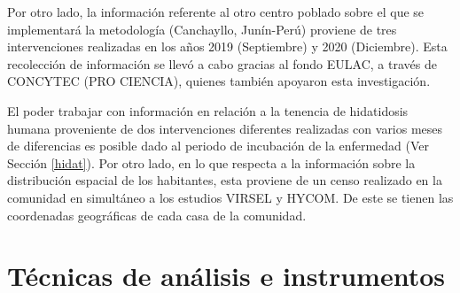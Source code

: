 Por otro lado, la información referente al otro centro poblado sobre el que se implementará la metodología (Canchayllo, Junín-Perú) proviene de tres intervenciones realizadas en los años 2019 (Septiembre) y 2020 (Diciembre). Esta recolección de información se llevó a cabo gracias al fondo EULAC, a través de CONCYTEC (PRO CIENCIA), quienes también apoyaron esta investigación.

El poder trabajar con información en relación a la tenencia de hidatidosis humana proveniente de dos intervenciones diferentes realizadas con varios meses de diferencias es posible dado al periodo de incubación de la enfermedad (Ver Sección \ref{hidat}). Por otro lado, en lo que respecta a la información sobre la distribución espacial de los habitantes, esta proviene de un censo realizado en la comunidad en simultáneo a los estudios VIRSEL y HYCOM. De este se tienen las coordenadas geográficas de cada casa de la comunidad.
\newpage
\section{Técnicas de análisis e instrumentos}
